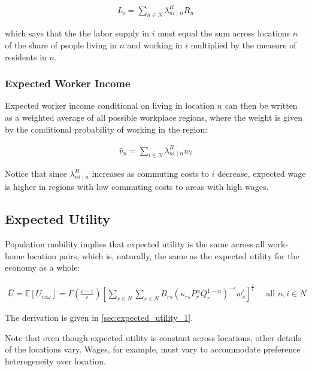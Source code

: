 \documentclass[10pt]{article}
\begin{document}
\begin{align}
    L_i=\sum_{n \in N} \lambda_{n i \mid n}^R R_n
\end{align}

which says that the 
the labor supply in $i$
must equal the sum across locations $n$ of 
the share of people living in $n$ 
and working in $i$ multiplied by
the measure of residents in $n$.

\subsubsection{Expected Worker Income}

Expected worker income
conditional on living in location $n$ 
can then be written as a weighted 
average of all possible workplace regions,
where the weight is given by the conditional probability 
of working in the region:

\begin{align}
    \bar{v}_n=\sum_{i \in N} \lambda_{n i \mid n}^R w_i \label{eq:expected_worker_income}
\end{align}

Notice that since $\lambda_{n i \mid n}^R$ increases 
as commuting costs to $i$ decrease, expected 
wage is higher in regions with 
low commuting costs to areas with high wages.

\subsection{Expected Utility}

Population mobility implies 
that expected utility 
is the same across 
all work-home location pairs,
which is, naturally, the same as the expected 
utility for the economy as a whole:

\begin{align}
    \bar{U}=\mathbb{E}\left[U_{n i \omega}\right]=\Gamma\left(\frac{\epsilon-1}{\epsilon}\right)\left[\sum_{r \in N} \sum_{s \in N} B_{r s}\left(\kappa_{r s} P_r^\alpha Q_r^{1-\alpha}\right)^{-\epsilon} w_s^\epsilon\right]^{\frac{1}{\epsilon}} \quad \text { all } n, i \in N \label{eq:expected_utility_1}
\end{align}

The derivation is given in \autoref{sec:expected_utility_1}.

Note that even though expected utility 
is constant across locations, other 
details of the locations vary. 
Wages, for example, must vary to accommodate 
preference heterogeneity over location. 
\end{document}
